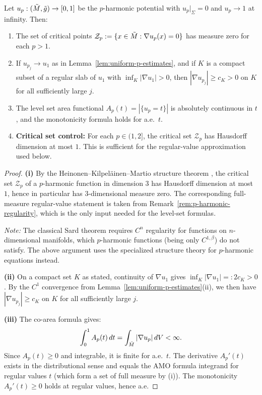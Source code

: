 \begin{remark}
\begin{lemma}\label{lem:gradient-lower-bound}
Let $u_p: (\tilde{M}, \tilde{g}) \to [0, 1]$ be the $p$-harmonic potential with $u_p|_\Sigma = 0$ and $u_p \to 1$ at infinity. Then:
\begin{enumerate}
    \item[(i)] The set of critical points $\mathcal{Z}_p := \{x \in \tilde{M} : \nabla u_p(x) = 0\}$ has measure zero for each $p > 1$.
    \item[(ii)] If $u_{p_j}\to u_1$ as in Lemma~\ref{lem:uniform-p-estimates}, and if $K$ is a compact subset of a regular slab of $u_1$ with $\inf_K |\nabla u_1|>0$, then $|\nabla u_{p_j}| \geq c_K>0$ on $K$ for all sufficiently large $j$.
    \item[(iii)] The level set area functional $A_p(t) = |\{u_p = t\}|$ is absolutely continuous in $t$, and the monotonicity formula holds for a.e.\ $t$.
    \item[(iv)] \textbf{Critical set control:} For each $p \in (1,2]$, the critical set $\mathcal{Z}_p$ has Hausdorff dimension at most $1$. This is sufficient for the regular-value approximation used below.
\end{enumerate}
\end{lemma}

\begin{proof}
\textbf{(i)} By the Heinonen--Kilpel\"ainen--Martio structure theorem \cite[Theorem 7.46]{heinonen1993}, the critical set $\mathcal{Z}_p$ of a $p$-harmonic function in dimension 3 has Hausdorff dimension at most $1$, hence in particular has $3$-dimensional measure zero. The corresponding full-measure regular-value statement is taken from Remark~\ref{rem:p-harmonic-regularity}, which is the only input needed for the level-set formulas.

\textit{Note:} The classical Sard theorem requires $C^n$ regularity for functions on $n$-dimensional manifolds, which $p$-harmonic functions (being only $C^{1,\beta}$) do not satisfy. The above argument uses the specialized structure theory for $p$-harmonic equations instead.

\textbf{(ii)} On a compact set $K$ as stated, continuity of $\nabla u_1$ gives $\inf_K |\nabla u_1| =: 2c_K > 0$. By the $C^1$ convergence from Lemma~\ref{lem:uniform-p-estimates}(ii), we then have $|\nabla u_{p_j}| \geq c_K$ on $K$ for all sufficiently large $j$.

\textbf{(iii)} The co-area formula gives:
\[
\int_0^1 A_p(t) \, dt = \int_{\tilde{M}} |\nabla u_p| \, dV < \infty.
\]
Since $A_p(t) \geq 0$ and integrable, it is finite for a.e.\ $t$. The derivative $A_p'(t)$ exists in the distributional sense and equals the AMO formula integrand for regular values $t$ (which form a set of full measure by (i)). The monotonicity $A_p'(t) \geq 0$ holds at regular values, hence a.e.


\end{proof}
\end{remark}
